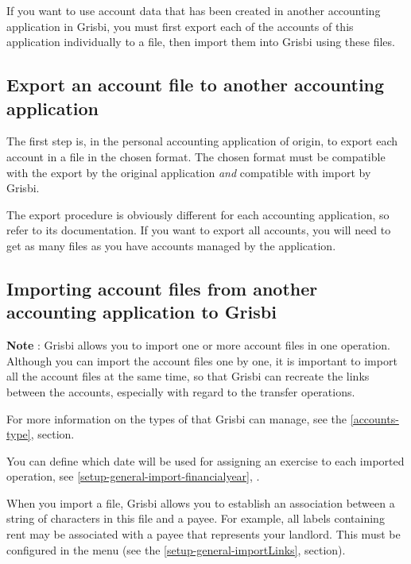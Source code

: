 If you want to use account data that has been created
in another accounting application in Grisbi, you must first export each of the accounts of this application individually to a file, then import them into Grisbi using these files.

\subsection{Export an account file to another accounting application \label{move-import-exportinit}}

The first step is, in the personal accounting application
of origin, to export each account in a file in the chosen format. The chosen format must be compatible with the export by the original application \emph{and} compatible with import by Grisbi.

The export procedure is obviously different for each accounting application, so refer to its documentation. If you want to export all accounts, you will need to get as many files as you have accounts managed by the application.


\subsection{Importing account files from another accounting application to Grisbi\label{move-import-importinit}}

\textbf{Note} : Grisbi allows you to import one or more account files in one operation. Although you can import the account files one by one, it is important to import all the account files at the same time, so that Grisbi can recreate the links between the accounts, especially with regard to the transfer operations.

For more information on the types of  that Grisbi can manage, see the \vref{accounts-type},  section.

You can define which date will be used for assigning an exercise to
each imported operation, see \vref{setup-general-import-financialyear}, .

When you import a file, Grisbi allows you to establish an association between a string of characters in this file and a payee. For example, all labels containing \og rent \fg{}  may be associated with a payee that represents your landlord. This must be configured in the  menu (see the \vref{setup-general-importLinks},  section).

